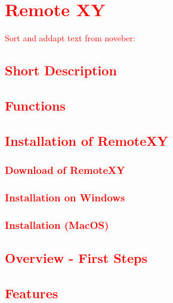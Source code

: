%
%

\chapter{\textcolor{red}{Remote XY}}
\textcolor{red}{Sort and addapt text from noveber: }



\section{\textcolor{red}{Short Description}}

\section{\textcolor{red}{Functions}}


\section{\textcolor{red}{Installation of RemoteXY}}

\subsection{\textcolor{red}{Download of RemoteXY}}

\subsection{\textcolor{red}{Installation on Windows}}

\subsection{\textcolor{red}{Installation (MacOS)}}

\section{\textcolor{red}{Overview - First Steps}}

\section{\textcolor{red}{Features}}






